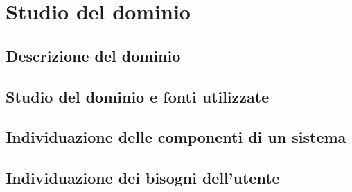 \section{Studio del dominio}
\subsection{Descrizione del dominio}
\subsection{Studio del dominio e fonti utilizzate}
\subsection{Individuazione delle componenti di un sistema}
\subsection{Individuazione dei bisogni dell’utente}